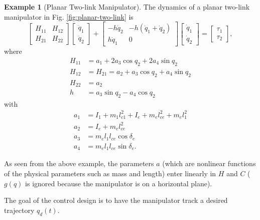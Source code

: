 \documentclass[
]{book}
\theoremstyle{definition}
\theoremstyle{definition}
\newtheorem{example}{Example}[chapter]
\theoremstyle{definition}
\theoremstyle{definition}
\theoremstyle{remark}
\begin{document}
\begin{example}[Planar Two-link Manipulator]
\protect\hypertarget{exm:planartwolinkmanipulator}{}\label{exm:planartwolinkmanipulator}The dynamics of a planar two-link manipulator in Fig. \ref{fig:planar-two-link} is
\begin{equation}
\begin{bmatrix} H_{11} & H_{12} \\ H_{21} & H_{22} \end{bmatrix}
\begin{bmatrix} \ddot{q}_1 \\ \ddot{q}_2 \end{bmatrix}
+ 
\begin{bmatrix} - h \dot{q}_2 & -h (\dot{q}_1 + \dot{q}_2) \\ h \dot{q}_1 & 0 \end{bmatrix}
\begin{bmatrix} \dot{q}_1 \\ \dot{q}_2 \end{bmatrix}
=
\begin{bmatrix} \tau_1 \\ \tau_2 \end{bmatrix},
\label{eq:ac-mrac-manipulator-dynamics-planartwolink}
\end{equation}
where
\begin{align}
H_{11} & = a_1 + 2 a_3 \cos q_2 + 2 a_4 \sin q_2 \\
H_{12} & = H_{21} = a_2 + a_3 \cos q_2 + a_4 \sin q_2 \\
H_{22} &= a_2 \\
h &= a_3 \sin q_2 - a_4 \cos q_2 
\end{align}
with
\begin{align}
a_1 &= I_1 + m_1 l_{c1}^2 + I_e + m_e l_{ce}^2 + m_e l_1^2 \\
a_2 &= I_e + m_e l_{ce}^2 \\
a_3 &= m_e l_1 l_{ce} \cos \delta_e \\
a_4 &= m_e l_1 l_{ce} \sin \delta_e.
\end{align}
\end{example}

As seen from the above example, the parameters \(a\) (which are nonlinear functions of the physical parameters such as mass and length) enter linearly in \(H\) and \(C\) (\(g(q)\) is ignored because the manipulator is on a horizontal plane).

The goal of the control design is to have the manipulator track a desired trajectory \(q_d(t)\).
\end{document}
